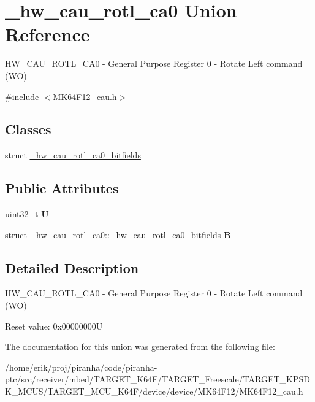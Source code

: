 \hypertarget{union__hw__cau__rotl__ca0}{}\section{\+\_\+hw\+\_\+cau\+\_\+rotl\+\_\+ca0 Union Reference}
\label{union__hw__cau__rotl__ca0}


H\+W\+\_\+\+C\+A\+U\+\_\+\+R\+O\+T\+L\+\_\+\+C\+A0 -\/ General Purpose Register 0 -\/ Rotate Left command (WO)  




{\ttfamily \#include $<$M\+K64\+F12\+\_\+cau.\+h$>$}

\subsection*{Classes}
\begin{DoxyCompactItemize}
\item 
struct \hyperlink{struct__hw__cau__rotl__ca0_1_1__hw__cau__rotl__ca0__bitfields}{\+\_\+hw\+\_\+cau\+\_\+rotl\+\_\+ca0\+\_\+bitfields}
\end{DoxyCompactItemize}
\subsection*{Public Attributes}
\begin{DoxyCompactItemize}
\item 
uint32\+\_\+t {\bfseries U}\hypertarget{union__hw__cau__rotl__ca0_a182a421fd25d53641989f5989906801e}{}\label{union__hw__cau__rotl__ca0_a182a421fd25d53641989f5989906801e}

\item 
struct \hyperlink{struct__hw__cau__rotl__ca0_1_1__hw__cau__rotl__ca0__bitfields}{\+\_\+hw\+\_\+cau\+\_\+rotl\+\_\+ca0\+::\+\_\+hw\+\_\+cau\+\_\+rotl\+\_\+ca0\+\_\+bitfields} {\bfseries B}\hypertarget{union__hw__cau__rotl__ca0_a370f9cab7c89bf7c792d3502312438a8}{}\label{union__hw__cau__rotl__ca0_a370f9cab7c89bf7c792d3502312438a8}

\end{DoxyCompactItemize}


\subsection{Detailed Description}
H\+W\+\_\+\+C\+A\+U\+\_\+\+R\+O\+T\+L\+\_\+\+C\+A0 -\/ General Purpose Register 0 -\/ Rotate Left command (WO) 

Reset value\+: 0x00000000U 

The documentation for this union was generated from the following file\+:\begin{DoxyCompactItemize}
\item 
/home/erik/proj/piranha/code/piranha-\/ptc/src/receiver/mbed/\+T\+A\+R\+G\+E\+T\+\_\+\+K64\+F/\+T\+A\+R\+G\+E\+T\+\_\+\+Freescale/\+T\+A\+R\+G\+E\+T\+\_\+\+K\+P\+S\+D\+K\+\_\+\+M\+C\+U\+S/\+T\+A\+R\+G\+E\+T\+\_\+\+M\+C\+U\+\_\+\+K64\+F/device/device/\+M\+K64\+F12/M\+K64\+F12\+\_\+cau.\+h\end{DoxyCompactItemize}
